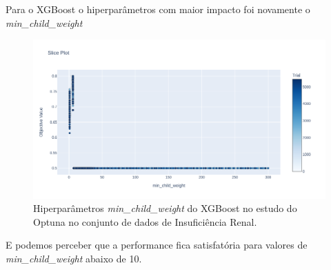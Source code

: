 Para o XGBoost o hiperparâmetros com maior impacto foi novamente o \textit{min\_child\_weight}
\begin{figure}[H]
 \caption{Hiperparâmetros \textit{min\_child\_weight} do XGBoost no estudo do Optuna no conjunto de dados de Insuficiência Renal.}
 \label{fig:op:kind:min:xgb}
 \centering
 \includegraphics[scale=0.3]{images/optuna_min_xgboost_kindey.png}
\end{figure}
E podemos perceber que a performance fica satisfatória para valores de \textit{min\_child\_weight} abaixo de 10.


